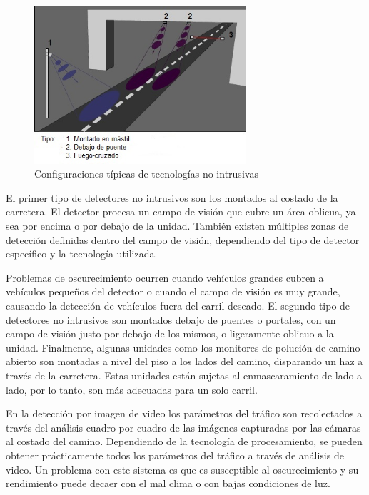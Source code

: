 \begin{figure}[h]
	\centering
	\includegraphics[width=0.7\textwidth]{capitulos/3/figuras/figura3.jpg}
	\caption{\label{fig:noIntrusica}  Configuraciones típicas de tecnologías no intrusivas}	
\end{figure}

El primer tipo de detectores no intrusivos son los montados al costado de la carretera. El detector procesa un campo de visión que cubre un área oblicua, ya sea por encima o por debajo de la unidad. También existen múltiples zonas de detección definidas dentro del campo de visión, dependiendo del tipo de detector específico y la tecnología utilizada.

Problemas de oscurecimiento ocurren cuando vehículos grandes cubren a vehículos pequeños del detector o cuando el campo de visión es muy grande, causando la detección de vehículos fuera del carril deseado. El segundo tipo de detectores no intrusivos son montados debajo de puentes o portales, con un campo de visión justo por debajo de los mismos, o ligeramente oblicuo a la unidad. Finalmente, algunas unidades como los monitores de polución de camino abierto son montadas a nivel del piso a los lados del camino, disparando un haz a través de la carretera. Estas unidades están sujetas al enmascaramiento de lado a lado, por lo tanto, son más adecuadas para un solo carril.

En la detección por imagen de video los parámetros del tráfico son recolectados a través del análisis cuadro por cuadro de las imágenes capturadas por las cámaras al costado del camino. Dependiendo de la tecnología de procesamiento, se pueden obtener prácticamente todos los parámetros del tráfico a través de análisis de video. Un problema con este sistema es que es susceptible al oscurecimiento y su rendimiento puede decaer con el mal clima o con bajas condiciones de luz.

